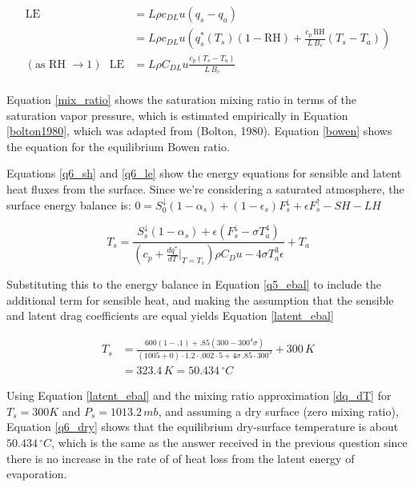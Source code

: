 \documentclass[12pt]{article}
\begin{document}
\begin{equation}\label{q6_le}
    \begin{split}
        \text{LE} &= L\rho c_{DL} u (q_s - q_a) \\
        &= L\rho c_{DL} u (q_s^*(T_s)(1-\text{RH})+\frac{c_p\,\text{RH}}{L\,B_e}(T_s-T_a)) \\
        (\text{as RH }\to 1) \,\,\,\,\text{LE} &= L\rho C_{DL} u \frac{c_p(T_s-T_a)}{L\,B_e} \\
    \end{split}
\end{equation}

Equation \ref{mix_ratio} shows the saturation mixing ratio in terms of the saturation vapor pressure, which is
estimated empirically in Equation \ref{bolton1980}, which was adapted from (Bolton, 1980). Equation \ref{bowen} shows
the equation for the equilibrium Bowen ratio.

Equations \ref{q6_sh} and \ref{q6_le} show the energy equations for sensible and latent heat fluxes from the surface.
Since we're considering a saturated atmosphere, the surface energy balance is:
$0 = S_0^\downarrow (1-\alpha_s) + (1-\epsilon_s) F_s^\downarrow + \epsilon F_s^\uparrow - SH - LH$

\begin{equation}\label{latent_ebal}
    T_s = \frac{S_s^\downarrow (1-\alpha_s) + \epsilon (F^\downarrow_s - \sigma T_a^4)}{(c_p + \frac{dq^*}{dT}|_{T=T_s}) \rho C_D u - 4\sigma T^3_a \epsilon} + T_a
\end{equation}

Substituting this to the energy balance in Equation \ref{q5_ebal} to include the additional term for sensible heat, and making the assumption that the sensible and latent drag coefficients are equal yields Equation \ref{latent_ebal}

\begin{equation}\label{q6_dry}
    \begin{split}
        T_s &= \frac{600(1-.1)+.85(300-300^4\sigma)}{(1005+0)\cdot1.2\cdot.002\cdot 5 + 4\sigma\,.85\cdot300^3} + 300\,\si{K} \\
        &= 323.4\,\si{K} = 50.434\,^\circ\si{C}
    \end{split}
\end{equation}

Using Equation \ref{latent_ebal} and the mixing ratio approximation \ref{dq_dT} for $T_s = 300K$ and $P_s = 1013.2\,\si{mb}$, and assuming a dry surface (zero mixing ratio), Equation \ref{q6_dry} shows that the equilibrium dry-surface temperature is about $50.434\,^\circ\si{C}$, which is the same as the answer received in the previous question since there is no increase in the rate of of heat loss from the latent energy of evaporation.
\end{document}
